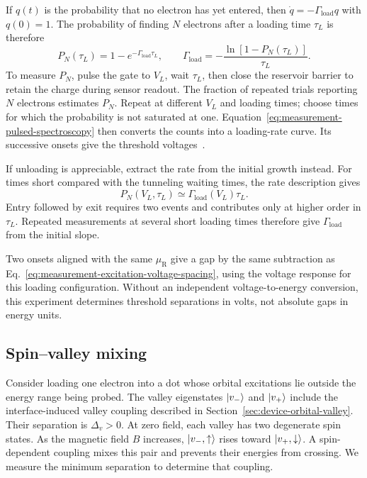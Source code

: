 If $q(t)$ is the probability that no electron has yet entered, then
$\dot q=-\Gamma_{\mathrm{load}}q$ with $q(0)=1$. The probability
of finding $N$ electrons after a loading time $\tau_L$ is therefore
\begin{equation}
 P_N(\tau_L)=1-e^{-\Gamma_{\mathrm{load}}\tau_L},
 \qquad
 \Gamma_{\mathrm{load}}=-\frac{\ln[1-P_N(\tau_L)]}{\tau_L}.
 \label{eq:measurement-pulsed-spectroscopy}
\end{equation}
To measure $P_N$, pulse the gate to $V_L$, wait $\tau_L$, then
close the reservoir barrier to retain the charge during sensor
readout. The fraction of repeated trials reporting $N$ electrons
estimates $P_N$. Repeat at different $V_L$ and loading times;
choose times for which the probability is not saturated at one.
Equation~\eqref{eq:measurement-pulsed-spectroscopy} then converts
the counts into a loading-rate curve. Its successive onsets give
the threshold voltages~\cite{Thalakulam2011}.

If unloading is appreciable, extract the rate from the initial
growth instead. For times short compared with the tunneling
waiting times, the rate description gives
\begin{equation}
 P_N(V_L,\tau_L)\simeq\Gamma_{\mathrm{load}}(V_L)\tau_L.
 \label{eq:measurement-short-time-loading}
\end{equation}
Entry followed by exit requires two events and contributes only
at higher order in $\tau_L$. Repeated measurements at several
short loading times therefore give $\Gamma_{\mathrm{load}}$
from the initial slope.

Two onsets aligned with the same $\mu_{\mathrm R}$ give a gap by
the same subtraction as
Eq.~\eqref{eq:measurement-excitation-voltage-spacing}, using the
voltage response for this loading configuration. Without an
independent voltage-to-energy conversion, this experiment determines
threshold separations in volts, not absolute gaps in energy units.

\subsection{Spin--valley mixing}
\label{sec:measurement-spin-valley}

Consider loading one electron into a dot whose orbital excitations
lie outside the energy range being probed. The valley eigenstates
$\lvert v_-\rangle$ and $\lvert v_+\rangle$ include the interface-induced valley coupling
described in Section~\ref{sec:device-orbital-valley}. Their
separation is $\Delta_v>0$. At zero field, each valley has two
degenerate spin states. As the magnetic field $B$ increases, $\lvert v_-,\uparrow\rangle$
rises toward $\lvert v_+,\downarrow\rangle$. A spin-dependent coupling
mixes this pair and prevents their energies from crossing.
We measure the minimum separation to determine that coupling.

